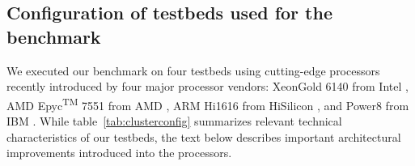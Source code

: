 \subsection{Configuration of testbeds used for the benchmark}
\label{sec:arch}
           
We executed our benchmark on four testbeds using cutting-edge processors recently introduced by four major processor vendors:
Xeon\textregistered Gold 6140 from Intel \cite{INTELXEONGOLD6140},
AMD Epyc\textsuperscript{TM} 7551 from AMD \cite{2019:epyc, now:epyc},
ARM Hi1616 from HiSilicon \cite{2017:hi1616,2019:hi1616},
and Power8 from IBM \cite{2015:power8,2016:power8}.
While
table~\ref{tab:clusterconfig} summarizes relevant technical characteristics of our testbeds,
the text below describes important architectural improvements introduced into the processors.

